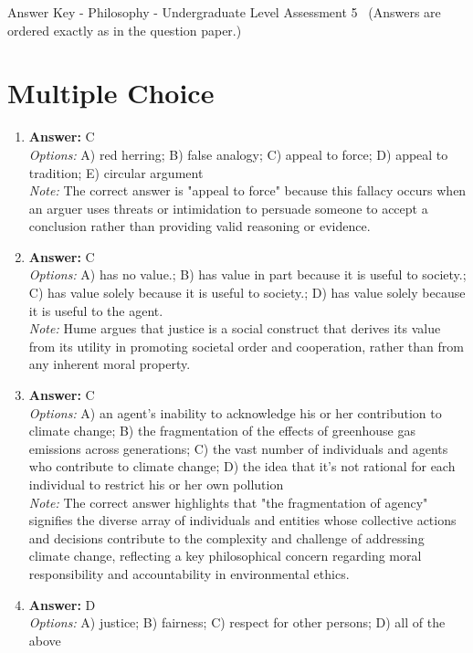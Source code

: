 \documentclass[12pt]{article}
\begin{document}
\begin{center}
Answer Key - Philosophy - Undergraduate Level Assessment 5 \
\small (Answers are ordered exactly as in the question paper.)
\end{center}

\section*{Multiple Choice}
\begin{enumerate}[label=\arabic*.]
\item \textbf{Answer:} C
\\ \textit{Options:} A) red herring; B) false analogy; C) appeal to force; D) appeal to tradition; E) circular argument
\\ \textit{Note:} The correct answer is "appeal to force" because this fallacy occurs when an arguer uses threats or intimidation to persuade someone to accept a conclusion rather than providing valid reasoning or evidence.
\item \textbf{Answer:} C
\\ \textit{Options:} A) has no value.; B) has value in part because it is useful to society.; C) has value solely because it is useful to society.; D) has value solely because it is useful to the agent.
\\ \textit{Note:} Hume argues that justice is a social construct that derives its value from its utility in promoting societal order and cooperation, rather than from any inherent moral property.
\item \textbf{Answer:} C
\\ \textit{Options:} A) an agent's inability to acknowledge his or her contribution to climate change; B) the fragmentation of the effects of greenhouse gas emissions across generations; C) the vast number of individuals and agents who contribute to climate change; D) the idea that it's not rational for each individual to restrict his or her own pollution
\\ \textit{Note:} The correct answer highlights that "the fragmentation of agency" signifies the diverse array of individuals and entities whose collective actions and decisions contribute to the complexity and challenge of addressing climate change, reflecting a key philosophical concern regarding moral responsibility and accountability in environmental ethics.
\item \textbf{Answer:} D
\\ \textit{Options:} A) justice; B) fairness; C) respect for other persons; D) all of the above

\end{enumerate}
\end{document}
